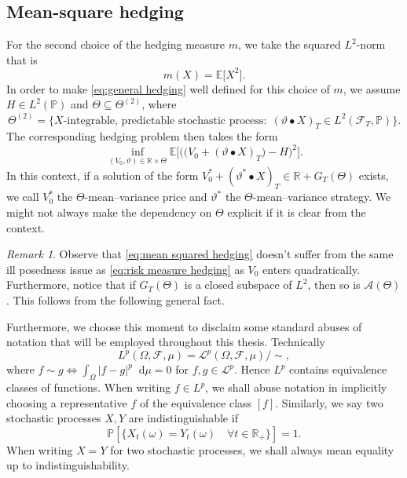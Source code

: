 \documentclass[11pt,a4paper,twoside,openany]{report}
\numberwithin{equation}{section}
\newcommand{\diff}{\mathop{}\!\mathrm{d}}
\theoremstyle{plain} %
\theoremstyle{definition} %
\theoremstyle{remark} %
\newtheorem{remark}[theorem]{Remark}
\begin{document}
\subsection{Mean-square hedging}\label{sec:high level discussion of mean-square hedging}
For the second choice of the hedging measure \(m\), we take the squared \(L^2\)-norm that is 
\begin{equation*}
    m(X)=\mathbb{E}\big[X^2\big].
\end{equation*}
In order to make \eqref{eq:general hedging} well defined for this choice of \(m\), we assume \(H\in L^2(\mathbb{P})\) and \(\Theta\subseteq\Theta^{(2)}\), where
\begin{equation}\label{eq:Theta2}
    \Theta^{(2)}=\big\{X\text{-integrable, predictable stochastic process}:\;(\vartheta\bullet X)_T\in L^2(\mathcal{F}_T,\mathbb{P})\big\} .
\end{equation}
The corresponding hedging problem then takes the form 
\begin{equation}\label{eq:mean squared hedging}
\inf_{(V_0,\vartheta)\in\mathbb{R}\times \Theta}\mathbb{E}\bigg[\Big(\big(V_0+(\vartheta\bullet X)_T\big)-H\Big)^2\bigg].
\end{equation}
In this context, if a solution of the form \(V_0^*+(\vartheta^*\bullet X)_T\in\mathbb{R}+ G_T(\Theta)\) exists, we call \(V_0^*\) the \(\Theta\)-mean--variance price and \(\vartheta^*\) the \(\Theta\)-mean--variance strategy. We might not always make the dependency on \(\Theta\) explicit if it is clear from the context.
\begin{remark}\label{rem:if G_T closed then mean--variance hedging is projection onto closed hilbert subspace}
    Observe that \eqref{eq:mean squared hedging} doesn't suffer from the same ill posedness issue as \eqref{eq:risk measure hedging} as \(V_0\) enters quadratically.
Furthermore, notice that if \(G_T(\Theta)\) is a closed subspace of \(L^2\), then so is \(\mathcal{A}(\Theta)\). This follows from the following general fact.
\end{remark}
Furthermore, we choose this moment to disclaim some standard abuses of notation that will be employed throughout this thesis. Technically 
\begin{equation*}
L^p(\Omega,\mathcal{F},\mu)=\mathcal{L}^p(\Omega,\mathcal{F},\mu)/\sim,
\end{equation*} 
where \(f\sim g\iff \int_{\Omega}|f-g|^p\diff \mu=0\) for \(f,g\in \mathcal{L}^p\).
Hence \(L^p\) contains equivalence classes of functions. When writing \(f\in L^p\), we shall abuse notation in implicitly choosing a representative \(f\) of the equivalence class \([f]\). Similarly, we say two stochastic processes \(X,Y\) are indistinguishable if 
\begin{equation*}
    \mathbb{P}[\{X_t(\omega)=Y_t(\omega)\quad\forall t\in \mathbb{R}_+\}]=1.
\end{equation*}
When writing \(X=Y\) for two stochastic processes, we shall always mean equality up to indistinguishability. 
\end{document}
